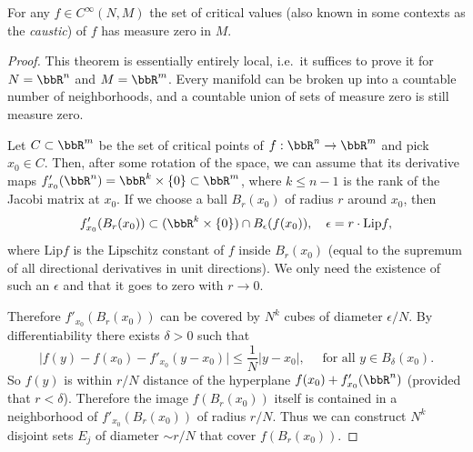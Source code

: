 \begin{thm}[Sard]\label{thm sard}
    For any $f\in C^\infty(N,M)$ the set of critical values (also known in some contexts as the \emph{caustic}) of $f$ has measure zero in $M$.
\end{thm}
\begin{proof}
    This theorem is essentially entirely local, i.e.\ it suffices to prove it for $N=\bbR^n$ and $M=\bbR^m$. Every manifold can be broken up into a countable number of neighborhoods, and a countable union of sets of measure zero is still measure zero.

    Let $C\subset \bbR^m$ be the set of critical points of $f:\bbR^n\to \bbR^m$ and pick $x_0\in C$. Then, after some rotation of the space, we can assume that its derivative maps $f'_{x_0}(\bbR^n)=\bbR^k\times \{0\}\subset \bbR^m$, where $k\leq n-1$ is the rank of the Jacobi matrix at $x_0$.  If we choose a ball $B_r(x_0)$ of radius $r$ around $x_0$, then
    \[f'_{x_0}(B_r(x_0))\subset (\bbR^k\times \{0\})\cap B_\epsilon(f(x_0)),\quad \epsilon=r\cdot \mathrm{Lip}f,\]
    where $\mathrm{Lip}f$ is the Lipschitz constant of $f$ inside $B_r(x_0)$ (equal to the supremum of all directional derivatives in unit directions). We only need the existence of such an $\epsilon$ and that it goes to zero with $r\to 0$.

    Therefore $f'_{x_0}(B_r(x_0))$ can be covered by $N^k$ cubes of diameter $\epsilon/N$. By differentiability there exists $\delta>0$ such that 
    \[\lvert f(y)-f(x_0)-f'_{x_0}(y-x_0)\rvert\leq \frac{1}{N}|y-x_0|,\quad \text{ for all }y\in B_\delta(x_0).\]
    So $f(y)$ is within $r/N$ distance of the hyperplane $f(x_0)+f'_{x_0}(\bbR^n)$ (provided that $r<\delta$). Therefore the image $f(B_r(x_0))$ itself is contained in a neighborhood of $f'_{x_0}(B_r(x_0))$ of radius $r/N$. Thus we can construct $N^k$ disjoint sets $E_j$ of diameter $\sim r/N$ that cover $f(B_r(x_0))$.


\end{proof}
